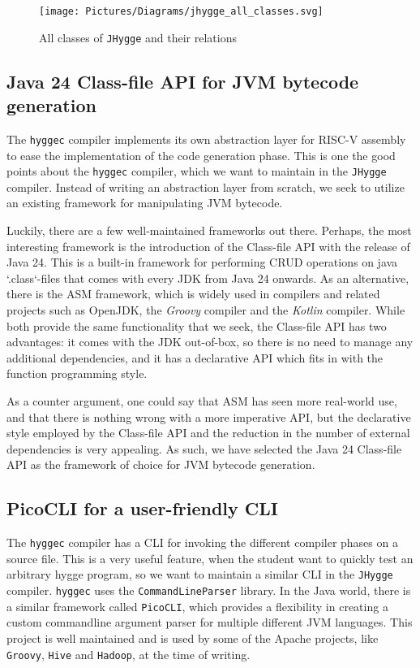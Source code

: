 \begin{figure}[H]
\centering
\texttt{[image: Pictures/Diagrams/jhygge\_all\_classes.svg]}
\caption{All classes of \texttt{JHygge} and their relations}
\label{fig:compiler_phases}
\end{figure}


\subsection{Java 24 Class-file API for JVM bytecode generation}

The \texttt{hyggec} compiler implements its own abstraction layer for RISC-V assembly to ease the implementation of the code
generation phase. This is one the good points about the \texttt{hyggec} compiler, which we want to maintain in the \texttt{JHygge}
compiler. Instead of writing an abstraction layer from scratch, we seek to utilize an existing framework for manipulating JVM
bytecode.

Luckily, there are a few well-maintained frameworks out there. Perhaps, the most interesting framework is the introduction of the
Class-file API with the release of Java 24. This is a built-in framework for performing CRUD operations on java `.class`-files
that comes with every JDK from Java 24 onwards. As an alternative, there is the ASM framework, which is widely used in compilers
and related projects such as OpenJDK, the \textit{Groovy} compiler and the \textit{Kotlin} compiler. While both provide the
same functionality that we seek, the Class-file API has two advantages: it comes with the JDK out-of-box, so there is no
need to manage any additional dependencies, and it has a declarative API which fits in with the function programming style.

As a counter argument, one could say that ASM has seen more real-world use, and that there is nothing wrong with a more imperative
API, but the declarative style employed by the Class-file API and the reduction in the number of external dependencies is very
appealing. As such, we have selected the Java 24 Class-file API as the framework of choice for JVM bytecode generation.

\subsection{PicoCLI for a user-friendly CLI}

The \texttt{hyggec} compiler has a CLI for invoking the different compiler phases on a source file. This is a very useful feature,
when the student want to quickly test an arbitrary hygge program, so we want to maintain a similar CLI in the \texttt{JHygge} compiler.
\texttt{hyggec} uses the \texttt{CommandLineParser} library. In the Java world, there is a similar framework called \texttt{PicoCLI},
which provides a flexibility in creating a custom commandline argument parser for multiple different JVM languages. This project
is well maintained and is used by some of the Apache projects, like \texttt{Groovy}, \texttt{Hive} and \texttt{Hadoop}, at the time of writing.
